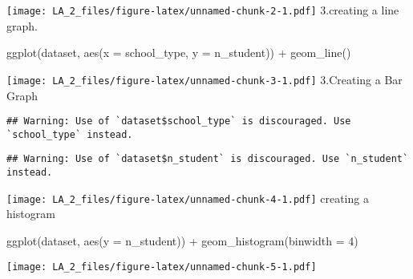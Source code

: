 \documentclass[
]{article}
\newenvironment{Shaded}{\begin{snugshade}}{\end{snugshade}}
\newcommand{\AttributeTok}[1]{\textcolor[rgb]{0.77,0.63,0.00}{#1}}
\newcommand{\DecValTok}[1]{\textcolor[rgb]{0.00,0.00,0.81}{#1}}
\newcommand{\FunctionTok}[1]{\textcolor[rgb]{0.00,0.00,0.00}{#1}}
\newcommand{\NormalTok}[1]{#1}
\newcommand{\SpecialCharTok}[1]{\textcolor[rgb]{0.00,0.00,0.00}{#1}}
\begin{document}
\texttt{[image: LA\_2\_files/figure-latex/unnamed-chunk-2-1.pdf]}
3.creating a line graph.

\begin{Shaded}
\begin{Highlighting}[]
\FunctionTok{ggplot}\NormalTok{(dataset, }\FunctionTok{aes}\NormalTok{(}\AttributeTok{x =}\NormalTok{ school\_type, }\AttributeTok{y =}\NormalTok{ n\_student)) }\SpecialCharTok{+}
\FunctionTok{geom\_line}\NormalTok{()}
\end{Highlighting}
\end{Shaded}

\texttt{[image: LA\_2\_files/figure-latex/unnamed-chunk-3-1.pdf]}
3.Creating a Bar Graph

\begin{Shaded}
\end{Shaded}

\begin{verbatim}
## Warning: Use of `dataset$school_type` is discouraged. Use `school_type` instead.
\end{verbatim}

\begin{verbatim}
## Warning: Use of `dataset$n_student` is discouraged. Use `n_student` instead.
\end{verbatim}

\texttt{[image: LA\_2\_files/figure-latex/unnamed-chunk-4-1.pdf]} creating
a histogram

\begin{Shaded}
\begin{Highlighting}[]
\FunctionTok{ggplot}\NormalTok{(dataset, }\FunctionTok{aes}\NormalTok{(}\AttributeTok{y =}\NormalTok{ n\_student)) }\SpecialCharTok{+}
\FunctionTok{geom\_histogram}\NormalTok{(}\AttributeTok{binwidth =} \DecValTok{4}\NormalTok{)}
\end{Highlighting}
\end{Shaded}

\texttt{[image: LA\_2\_files/figure-latex/unnamed-chunk-5-1.pdf]}

\begin{Shaded}
\end{Shaded}
\end{document}
